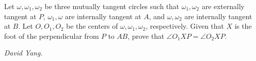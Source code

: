 Let $\omega,\omega_1,\omega_2$ be three mutually tangent circles such that $\omega_1,\omega_2$ are externally tangent at $P$, $\omega_1,\omega$ are internally tangent at $A$, and $\omega,\omega_2$ are internally tangent at $B$. Let $O,O_1,O_2$ be the centers of $\omega,\omega_1,\omega_2$, respectively. Given that $X$ is the foot of the perpendicular from $P$ to $AB$, prove that $\angle{O_1XP}=\angle{O_2XP}$.

\textit{David Yang.}
